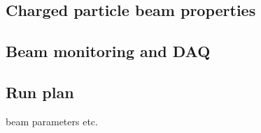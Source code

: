 
\subsection{Charged particle beam properties}

\subsection{Beam monitoring and DAQ}

\subsection{Run plan}

beam parameters etc.

